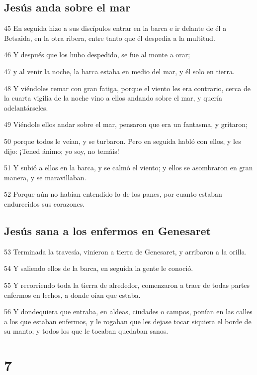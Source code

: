 \section*{Jesús anda sobre el mar}

\par 45 En seguida hizo a sus discípulos entrar en la barca e ir delante de él a Betsaida, en la otra ribera, entre tanto que él despedía a la multitud.
\par 46 Y después que los hubo despedido, se fue al monte a orar;
\par 47 y al venir la noche, la barca estaba en medio del mar, y él solo en tierra.
\par 48 Y viéndoles remar con gran fatiga, porque el viento les era contrario, cerca de la cuarta vigilia de la noche vino a ellos andando sobre el mar, y quería adelantárseles.
\par 49 Viéndole ellos andar sobre el mar, pensaron que era un fantasma, y gritaron;
\par 50 porque todos le veían, y se turbaron. Pero en seguida habló con ellos, y les dijo: ¡Tened ánimo; yo soy, no temáis!
\par 51 Y subió a ellos en la barca, y se calmó el viento; y ellos se asombraron en gran manera, y se maravillaban.
\par 52 Porque aún no habían entendido lo de los panes, por cuanto estaban endurecidos sus corazones.

\section*{Jesús sana a los enfermos en Genesaret}

\par 53 Terminada la travesía, vinieron a tierra de Genesaret, y arribaron a la orilla.
\par 54 Y saliendo ellos de la barca, en seguida la gente le conoció.
\par 55 Y recorriendo toda la tierra de alrededor, comenzaron a traer de todas partes enfermos en lechos, a donde oían que estaba.
\par 56 Y dondequiera que entraba, en aldeas, ciudades o campos, ponían en las calles a los que estaban enfermos, y le rogaban que les dejase tocar siquiera el borde de su manto; y todos los que le tocaban quedaban sanos.

\chapter{7}

